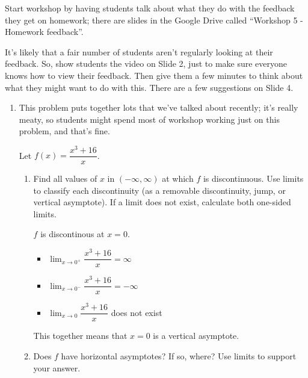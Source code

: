 \documentclass{article}
\begin{document}

\begin{workshop}
  Start workshop by having students talk about what they do with the feedback they get on homework; there are slides in the Google Drive called ``Workshop 5 - Homework feedback''.

  It's likely that a fair number of students aren't regularly looking at their feedback. So, show students the video on Slide 2, just to make sure everyone knows how to view their feedback. Then give them a few minutes to think about what they might want to do with this. There are a few suggestions on Slide 4.   
\end{workshop}

\begin{enumerate}
\item 

  \begin{workshop}
    This problem puts together lots that we've talked about recently; it's really meaty, so students might spend most of workshop working just on this problem, and that's fine. 
  \end{workshop}

  Let $f(x) = \dfrac{x^3 + 16}{x}$.
  \begin{enumerate}
  \item
    \begin{problem}[\vfill]
      Find all values of $x$ in $(-\infty, \infty)$ at which $f$ is discontinuous. Use limits to classify each discontinuity (as a removable discontinuity, jump, or vertical asymptote). If a limit does not exist, calculate both one-sided limits.
    \end{problem}

    \begin{solution}
        $f$ is discontinous at $x=0$. 
        \begin{itemize}
            \item $\displaystyle \lim_{x \to 0^+} \dfrac{x^3 + 16}{x} = \infty$
              \item $\displaystyle \lim_{x \to 0^-} \dfrac{x^3 + 16}{x} = -\infty$
              \item $\displaystyle \lim_{x \to 0} \dfrac{x^3 + 16}{x}$ does not exist
        \end{itemize}
        This together means that $x=0$ is a vertical asymptote.
    \end{solution}

  \item
    \begin{problem}[\vfill]
      Does $f$ have horizontal asymptotes? If so, where? Use limits to support your answer. 
    \end{problem}


\end{enumerate}
\end{enumerate}
\end{document}
